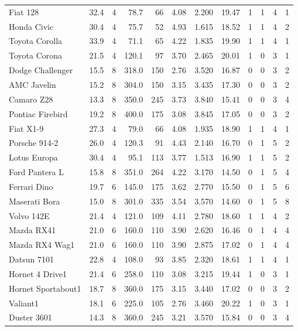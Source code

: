 \documentclass[a4paper, nobind]{templates/ociamthesis}
\begin{document}
\begin{scriptsize}
\begin{longtable}{lrrrrrrrrrrr}
Fiat 128 & 32.4 & 4 & 78.7 & 66 & 4.08 & 2.200 & 19.47 & 1 & 1 & 4 & 1\\
Honda Civic & 30.4 & 4 & 75.7 & 52 & 4.93 & 1.615 & 18.52 & 1 & 1 & 4 & 2\\
Toyota Corolla & 33.9 & 4 & 71.1 & 65 & 4.22 & 1.835 & 19.90 & 1 & 1 & 4 & 1\\
\addlinespace
Toyota Corona & 21.5 & 4 & 120.1 & 97 & 3.70 & 2.465 & 20.01 & 1 & 0 & 3 & 1\\
Dodge Challenger & 15.5 & 8 & 318.0 & 150 & 2.76 & 3.520 & 16.87 & 0 & 0 & 3 & 2\\
AMC Javelin & 15.2 & 8 & 304.0 & 150 & 3.15 & 3.435 & 17.30 & 0 & 0 & 3 & 2\\
Camaro Z28 & 13.3 & 8 & 350.0 & 245 & 3.73 & 3.840 & 15.41 & 0 & 0 & 3 & 4\\
Pontiac Firebird & 19.2 & 8 & 400.0 & 175 & 3.08 & 3.845 & 17.05 & 0 & 0 & 3 & 2\\
\addlinespace
Fiat X1-9 & 27.3 & 4 & 79.0 & 66 & 4.08 & 1.935 & 18.90 & 1 & 1 & 4 & 1\\
Porsche 914-2 & 26.0 & 4 & 120.3 & 91 & 4.43 & 2.140 & 16.70 & 0 & 1 & 5 & 2\\
Lotus Europa & 30.4 & 4 & 95.1 & 113 & 3.77 & 1.513 & 16.90 & 1 & 1 & 5 & 2\\
Ford Pantera L & 15.8 & 8 & 351.0 & 264 & 4.22 & 3.170 & 14.50 & 0 & 1 & 5 & 4\\
Ferrari Dino & 19.7 & 6 & 145.0 & 175 & 3.62 & 2.770 & 15.50 & 0 & 1 & 5 & 6\\
\addlinespace
Maserati Bora & 15.0 & 8 & 301.0 & 335 & 3.54 & 3.570 & 14.60 & 0 & 1 & 5 & 8\\
Volvo 142E & 21.4 & 4 & 121.0 & 109 & 4.11 & 2.780 & 18.60 & 1 & 1 & 4 & 2\\
Mazda RX41 & 21.0 & 6 & 160.0 & 110 & 3.90 & 2.620 & 16.46 & 0 & 1 & 4 & 4\\
Mazda RX4 Wag1 & 21.0 & 6 & 160.0 & 110 & 3.90 & 2.875 & 17.02 & 0 & 1 & 4 & 4\\
Datsun 7101 & 22.8 & 4 & 108.0 & 93 & 3.85 & 2.320 & 18.61 & 1 & 1 & 4 & 1\\
\addlinespace
Hornet 4 Drive1 & 21.4 & 6 & 258.0 & 110 & 3.08 & 3.215 & 19.44 & 1 & 0 & 3 & 1\\
Hornet Sportabout1 & 18.7 & 8 & 360.0 & 175 & 3.15 & 3.440 & 17.02 & 0 & 0 & 3 & 2\\
Valiant1 & 18.1 & 6 & 225.0 & 105 & 2.76 & 3.460 & 20.22 & 1 & 0 & 3 & 1\\
Duster 3601 & 14.3 & 8 & 360.0 & 245 & 3.21 & 3.570 & 15.84 & 0 & 0 & 3 & 4\\

\end{longtable}
\end{scriptsize}
\end{document}
